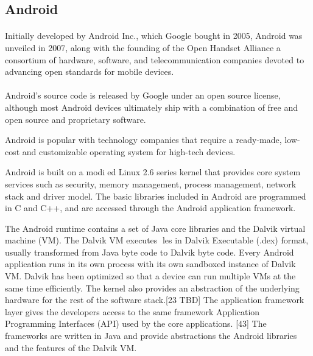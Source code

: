\subsection{Android}


\paragraph{}
Initially developed by Android Inc., which Google bought in 2005, Android was unveiled in 2007,
along with the founding of the Open Handset Alliance
a consortium of hardware, software, and telecommunication companies devoted to advancing open standards for mobile devices.

\paragraph{}
Android's source code is released by Google under an open source license,
although most Android devices ultimately ship with a combination of free and open source and proprietary software.

Android is popular with technology companies that require a ready-made, low-cost and customizable operating system for high-tech devices.

Android is built on a modied Linux 2.6 series kernel that provides core system services such as security, memory management, process management, network stack and driver model.
The basic libraries included in Android are programmed in C and C++, and are accessed through the Android application framework.

The Android runtime contains a set of Java core libraries and the Dalvik virtual machine (VM).
The Dalvik VM executes les in Dalvik Executable (.dex) format, usually transformed from Java byte code to Dalvik byte code.
Every Android application runs in its own process with its own sandboxed instance of Dalvik VM.
Dalvik has been optimized so that a device can run multiple VMs at the same time efficiently.
The kernel also provides an abstraction of the underlying hardware for the rest of the software stack.[23 TBD]
The application framework layer gives the developers access to the same framework Application Programming Interfaces (API) used by the core applications.
[43] The frameworks are written in Java and provide abstractions the Android libraries and the features of the Dalvik VM.

